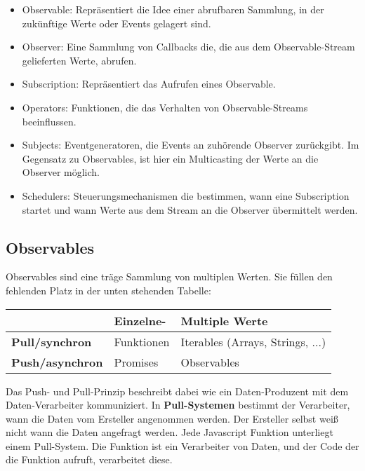 \begin{itemize}
    \item Observable: Repräsentiert die Idee einer abrufbaren Sammlung, in der zukünftige Werte oder Events gelagert sind.
    \item Observer: Eine Sammlung von Callbacks die, die  aus dem Observable-Stream gelieferten Werte, abrufen.
    \item Subscription: Repräsentiert das Aufrufen eines Observable.
    \item Operators: Funktionen, die das Verhalten von Observable-Streams beeinflussen.
    \item Subjects: Eventgeneratoren, die Events an zuhörende Observer zurückgibt. Im Gegensatz zu Observables, ist hier ein Multicasting der Werte an die Observer möglich.
    \item Schedulers: Steuerungsmechanismen die bestimmen, wann eine Subscription startet und wann Werte aus dem Stream an die Observer übermittelt werden.
\end{itemize}

\subsection{Observables}

Observables sind eine träge Sammlung von multiplen Werten. Sie füllen den fehlenden Platz in der unten stehenden Tabelle:

\begin{center}
    \begin{tabular}{| l | l | l |}
    \hline
    & \textbf{Einzelne-} & \textbf{Multiple Werte} \\ \hline
    \textbf{Pull/synchron} & Funktionen & Iterables (Arrays, Strings, ...) \\ \hline
    \textbf{Push/asynchron} & Promises & Observables  \\ \hline
    \end{tabular}
\end{center}

\noindent
Das Push- und Pull-Prinzip beschreibt dabei wie ein Daten-Produzent mit dem Daten-Verarbeiter kommuniziert. In \textbf{Pull-Systemen} bestimmt der Verarbeiter, wann die Daten vom Ersteller angenommen werden. Der Ersteller selbst weiß nicht wann die Daten angefragt werden.
Jede Javascript Funktion unterliegt einem Pull-System. Die Funktion ist ein Verarbeiter von Daten, und der Code der die Funktion aufruft, verarbeitet diese.\\

